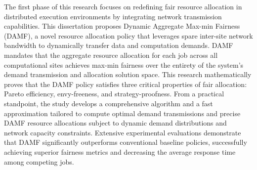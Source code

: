 \documentclass[12pt,a4paper]{Thesis} %
\begin{document}
The first phase of this research focuses on redefining fair resource allocation in distributed execution environments by integrating network transmission capabilities. This dissertation proposes Dynamic Aggregate Max-min Fairness (DAMF), a novel resource allocation policy that leverages spare inter-site network bandwidth to dynamically transfer data and computation demands. DAMF mandates that the aggregate resource allocation for each job across all computational sites achieves max-min fairness over the entirety of the system's demand transmission and allocation solution space. This research mathematically proves that the DAMF policy satisfies three critical properties of fair allocation: Pareto efficiency, envy-freeness, and strategy-proofness. From a practical standpoint, the study develops a comprehensive algorithm and a fast approximation tailored to compute optimal demand transmissions and precise DAMF resource allocations subject to dynamic demand distributions and network capacity constraints. Extensive experimental evaluations demonstrate that DAMF significantly outperforms conventional baseline policies, successfully achieving superior fairness metrics and decreasing the average response time among competing jobs.
\end{document}
